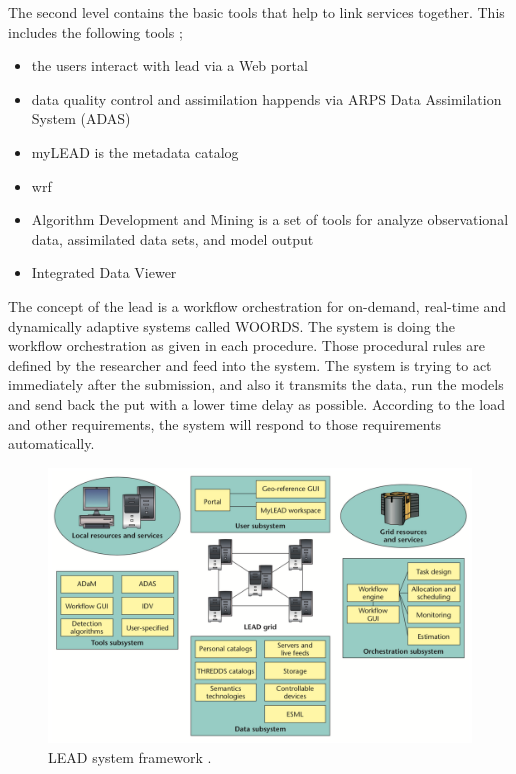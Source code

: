 The second level contains the basic tools that help to link services together. This includes the following tools \cite{Droegemeier2005Service-OrientedWeather};
\begin{itemize}
    \item the users interact with \acrshort{lead} via a Web portal
    \item data quality control and assimilation happends via ARPS Data Assimilation System (ADAS)
    \item myLEAD is the metadata catalog
    \item \acrfull{wrf} \cite{MesoscaleMicroscaleMeteorologyLaboratoryWeatherModel}
    \item Algorithm Development and Mining is a set of tools for analyze observational data, assimilated data sets, and model output 
    \item Integrated Data Viewer 
\end{itemize}

The concept of the \acrshort{lead} is a workflow orchestration for on-demand, real-time and dynamically adaptive systems called WOORDS. The system is doing the workflow orchestration as given in each procedure. Those procedural rules are defined by the researcher and feed into the system. The system is trying to act immediately after the submission, and also it transmits the data, run the models and send back the put with a lower time delay as possible. According to the load and other requirements, the system will respond to those requirements automatically.

\begin{figure}[htp]
    \centering
    \includegraphics[width=1.0\textwidth]{lit/lead/LEAD-system-framework-LEAD-is-composed-of-several-interacting-subsystems-with-the-LEAD_W640.png}
    \caption[LEAD system framework]{LEAD system framework \cite{Droegemeier2005Service-OrientedWeather}.}
    \label{fi:lead_framework}
\end{figure}

